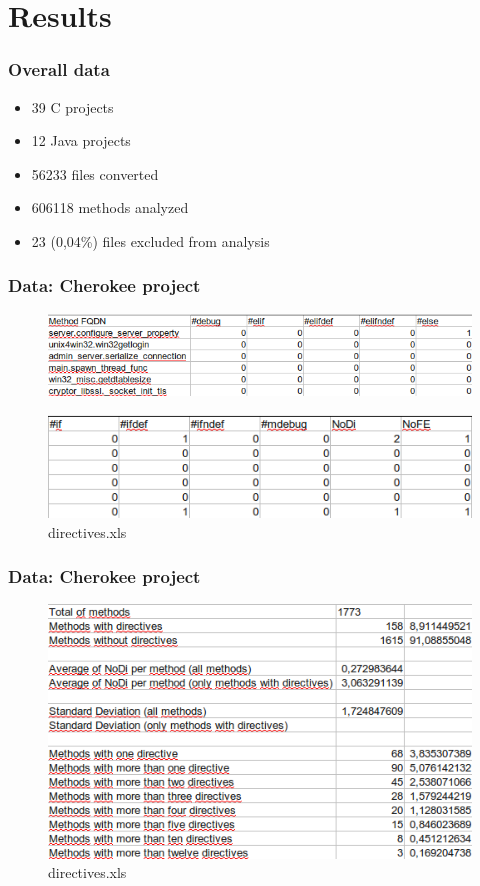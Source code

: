 \section{Results}

\begin{frame}
	\frametitle{Overall data}
	\begin{itemize}
		\item 39 C projects
		\item 12 Java projects
		\item 56233 files converted
		\item 606118 methods analyzed
		\item 23 (0,04\%) files excluded from analysis
	\end{itemize}
\end{frame}

\begin{frame}
	\frametitle{Data: Cherokee project}
	\begin{figure}
		\centering
		\includegraphics[scale=0.45]{images/directives1}
	\end{figure}
	\begin{figure}
		\centering
		\includegraphics[scale=0.45]{images/directives2}
		\caption{directives.xls}
	\end{figure}
\end{frame}

\begin{frame}
	\frametitle{Data: Cherokee project}
	\begin{figure}
		\centering
		\includegraphics[scale=0.45]{images/directives3}
		\caption{directives.xls}
	\end{figure}
\end{frame}

